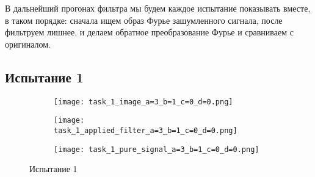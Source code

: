   

В дальнейший прогонах фильтра мы будем каждое испытание показывать вместе, в таком порядке: сначала ищем образ Фурье зашумленного сигнала,  после фильтруем лишнее, и делаем обратное преобразование Фурье и сравниваем с оригиналом.

\newpage
\subsection{Испытание 1}

\begin{figure}[!ht]
	\centering
\hspace*{\fill}%
	\begin{subfigure}[b]{0.30\textwidth}
        \centering
		\texttt{[image: task\_1\_image\_a=3\_b=1\_c=0\_d=0.png]}
		\caption{}
	
	\end{subfigure}
\hfill
	\begin{subfigure}[b]{0.30\textwidth}
        \centering
		\texttt{[image: task\_1\_applied\_filter\_a=3\_b=1\_c=0\_d=0.png]}
        \caption{}
		
	\end{subfigure}
\hspace*{\fill}%
\par\vspace{\abovecaptionskip}
        \begin{subfigure}[b]{0.30\textwidth}
        \centering
		\texttt{[image: task\_1\_pure\_signal\_a=3\_b=1\_c=0\_d=0.png]}
		\caption{}
	
	\end{subfigure}
	\caption{Испытание 1}
\end{figure}

